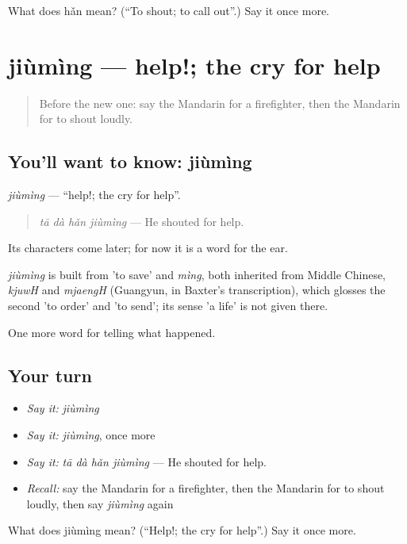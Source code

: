 \begin{tcolorbox}[breakable,colback=teal!4,colframe=teal!35!black,title={Before you move on}]
What does hǎn mean? (\textquotedblleft{}To shout; to call out\textquotedblright{}.) Say it once more.
\end{tcolorbox}
\section[jiùmìng]{jiùmìng — help!; the cry for help}

\label{lesson:ZH-C298-jiuming}



\begin{quote}
Before the new one: say the Mandarin for a firefighter, then the Mandarin for to shout loudly.
\end{quote}

\subsection*{You'll want to know: jiùmìng}
\emph{jiùmìng} — \textquotedblleft{}help!; the cry for help\textquotedblright{}.

\begin{quote}
\emph{tā dà hǎn jiùmìng} — He shouted for help.
\end{quote}

Its characters come later; for now it is a word for the ear.

\begin{cousinweb}
\emph{jiùmìng} is built from  'to save' and \emph{mìng}, both inherited from Middle Chinese, \emph{kjuwH} and \emph{mjaengH} (Guangyun, in Baxter's transcription), which glosses the second 'to order' and 'to send'; its sense 'a life' is not given there.
\end{cousinweb}

\begin{grammarlens}[title={What you've built}]
One more word for telling what happened.
\end{grammarlens}

\subsection*{Your turn}
\begin{itemize}
\raggedright
  \item \emph{Say it:} \emph{jiùmìng}
  \item \emph{Say it:} \emph{jiùmìng}, once more
  \item \emph{Say it:} \emph{tā dà hǎn jiùmìng} — He shouted for help.
  \item \emph{Recall:} say the Mandarin for a firefighter, then the Mandarin for to shout loudly, then say \emph{jiùmìng} again
\end{itemize}

\begin{tcolorbox}[breakable,colback=teal!4,colframe=teal!35!black,title={Before you move on}]
What does jiùmìng mean? (\textquotedblleft{}Help!; the cry for help\textquotedblright{}.) Say it once more.
\end{tcolorbox}
